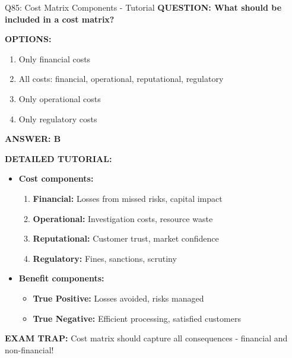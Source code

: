 \documentclass[8pt]{beamer}
\begin{document}
\begin{frame}{Q85: Cost Matrix Components - Tutorial}
	\fontsize{6.5}{7.5}\selectfont
	\textbf{QUESTION: What should be included in a cost matrix?}
	
	\vspace{0.1cm}
	\textbf{OPTIONS:}
	\begin{enumerate}
		\item Only financial costs
		\item All costs: financial, operational, reputational, regulatory
		\item Only operational costs
		\item Only regulatory costs
	\end{enumerate}
	
	\vspace{0.1cm}
	\textcolor{myblue}{\textbf{ANSWER: B}}
	
	\vspace{0.1cm}
	\textbf{DETAILED TUTORIAL:}
	\begin{itemize}
		\item \textbf{Cost components:}
		\begin{enumerate}
			\item \textbf{Financial:} Losses from missed risks, capital impact
			\item \textbf{Operational:} Investigation costs, resource waste
			\item \textbf{Reputational:} Customer trust, market confidence
			\item \textbf{Regulatory:} Fines, sanctions, scrutiny
		\end{enumerate}
		\item \textbf{Benefit components:}
		\begin{itemize}
			\item \textbf{True Positive:} Losses avoided, risks managed
			\item \textbf{True Negative:} Efficient processing, satisfied customers
		\end{itemize}
	\end{itemize}
	
	\textcolor{myred}{\textbf{EXAM TRAP:}} Cost matrix should capture \textcolor{myblue}{all consequences} - financial and non-financial!
\end{frame}
\end{document}
